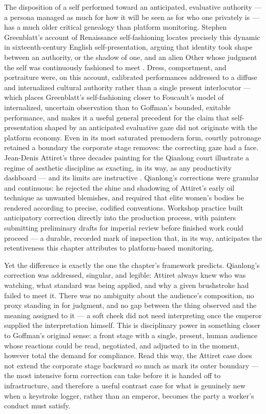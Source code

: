 \documentclass[10pt]{article}
\begin{document}
The disposition of a self performed toward an anticipated, evaluative authority --- a persona managed as much for how it will be seen as for who one privately is --- has a much older critical genealogy than platform monitoring. Stephen Greenblatt's account of Renaissance self-fashioning locates precisely this dynamic in sixteenth-century English self-presentation, arguing that identity took shape between an authority, or the shadow of one, and an alien Other whose judgment the self was continuously fashioned to meet \cite{greenblatt}. Dress, comportment, and portraiture were, on this account, calibrated performances addressed to a diffuse and internalized cultural authority rather than a single present interlocutor --- which places Greenblatt's self-fashioning closer to Foucault's model of internalized, uncertain observation than to Goffman's bounded, exitable performance, and makes it a useful general precedent for the claim that self-presentation shaped by an anticipated evaluative gaze did not originate with the platform economy. Even in its most saturated premodern form, courtly patronage retained a boundary the corporate stage removes: the correcting gaze had a face. Jean-Denis Attiret's three decades painting for the Qianlong court illustrate a regime of aesthetic discipline as exacting, in its way, as any productivity dashboard --- and its limits are instructive \cite{kleutghen}. Qianlong's corrections were granular and continuous: he rejected the shine and shadowing of Attiret's early oil technique as unwanted blemishes, and required that elite women's bodies be rendered according to precise, codified conventions. Workshop practice built anticipatory correction directly into the production process, with painters submitting preliminary drafts for imperial review before finished work could proceed --- a durable, recorded mark of inspection that, in its way, anticipates the retentiveness this chapter attributes to platform-based monitoring.

Yet the difference is exactly the one the chapter's framework predicts. Qianlong's correction was addressed, singular, and legible: Attiret always knew who was watching, what standard was being applied, and why a given brushstroke had failed to meet it. There was no ambiguity about the audience's composition, no proxy standing in for judgment, and no gap between the thing observed and the meaning assigned to it --- a soft cheek did not need interpreting once the emperor supplied the interpretation himself. This is disciplinary power in something closer to Goffman's original sense: a front stage with a single, present, human audience whose reactions could be read, negotiated, and adjusted to in the moment, however total the demand for compliance. Read this way, the Attiret case does not extend the corporate stage backward so much as mark its outer boundary --- the most intensive form correction can take before it is handed off to infrastructure, and therefore a useful contrast case for what is genuinely new when a keystroke logger, rather than an emperor, becomes the party a worker's conduct must satisfy.
\end{document}
